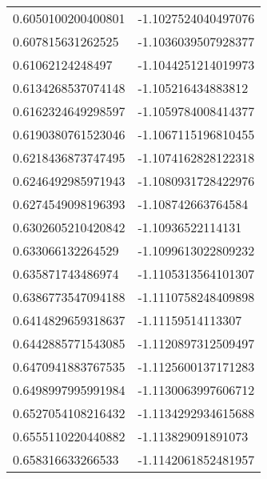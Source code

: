 \begin{supertabular}{ll}
0.6050100200400801  & -1.1027524040497076   \\
0.607815631262525   & -1.1036039507928377   \\
0.61062124248497    & -1.1044251214019973   \\
0.6134268537074148  & -1.105216434883812    \\
0.6162324649298597  & -1.1059784008414377   \\
0.6190380761523046  & -1.1067115196810455   \\
0.6218436873747495  & -1.1074162828122318   \\
0.6246492985971943  & -1.1080931728422976   \\
0.6274549098196393  & -1.108742663764584    \\
0.6302605210420842  & -1.10936522114131     \\
0.633066132264529   & -1.1099613022809232   \\
0.635871743486974   & -1.1105313564101307   \\
0.6386773547094188  & -1.1110758248409898   \\
0.6414829659318637  & -1.11159514113307     \\
0.6442885771543085  & -1.1120897312509497   \\
0.6470941883767535  & -1.1125600137171283   \\
0.6498997995991984  & -1.1130063997606712   \\
0.6527054108216432  & -1.1134292934615688   \\
0.6555110220440882  & -1.113829091891073    \\
0.658316633266533   & -1.1142061852481957   \\
\end{supertabular}
